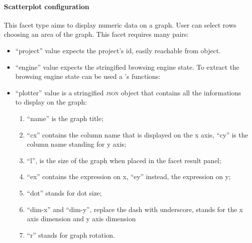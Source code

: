 \paragraph{Scatterplot configuration}
This facet type aims to display numeric data on a graph. User can select rows choosing an area of the graph. This facet requires many pairs:
\begin{itemize}
		\item \textsf{``project''} value expects the project's id, easily reachable from  object. 
		\item \textsf{``engine''} value expects the stringified browsing engine state. To extract the browsing engine state can be used a 's functions: 
		\item \textsf{``plotter''} value is a stringified \textsc{json} object that contains all the informations to display on the graph:
			\begin{enumerate}
				\item \textsf{``name''} is the graph title;
				\item \textsf{``cx''} contains the column name that is displayed on the x axis, \textsf{``cy''} is the column name standing for y axis;
				\item \textsf{``l''}, is the size of the graph when placed in the facet result panel;
				\item \textsf{``ex''} contains the expression on x, \textsf{``ey''} instead, the expression on y;
				\item \textsf{``dot''} stands for dot size;
				\item \textsf{``dim-x''} and \textsf{``dim-y''}, replace the dash with underscore, stands for the x axis dimension and y axis dimension 
				\item \textsf{``r''}  stands for graph rotation. 
			\end{enumerate}
\end{itemize}	

